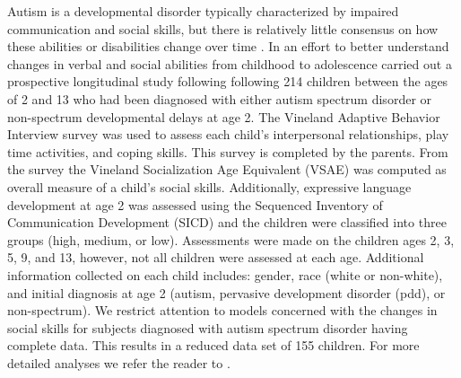 \documentclass{article} %
\begin{document}
Autism is a developmental disorder typically characterized by impaired communication and social skills, but there is relatively little consensus on how these abilities or disabilities change over time \citep{Anderson:2007cl, Anderson:2009in}. In an effort to better understand changes in verbal and social abilities from childhood to adolescence \cite{Anderson:2007cl, Anderson:2009in} carried out a prospective longitudinal study following following 214 children between the ages of 2 and 13 who had been diagnosed with either autism spectrum disorder or non-spectrum developmental delays at age 2. 
The Vineland Adaptive Behavior Interview survey was used to assess each child's interpersonal relationships, play time activities, and coping skills. This survey is completed by the parents. From the survey the Vineland Socialization Age Equivalent (VSAE) was computed as overall measure of a child's social skills. Additionally, expressive language development at age 2 was assessed using the Sequenced Inventory of Communication Development (SICD) and the children were classified into three groups (high, medium, or low). Assessments were made on the children ages 2, 3, 5, 9, and 13, however, not all children were assessed at each age. Additional information collected on each child includes: gender, race (white or non-white), and initial diagnosis at age 2 (autism, pervasive development disorder (pdd), or non-spectrum). We restrict attention to models concerned with the changes in social skills for subjects diagnosed with autism spectrum disorder having complete data. This results in a reduced data set of 155 children. For more detailed analyses we refer the reader to \cite{Anderson:2007cl, Anderson:2009in}.





\end{document}
